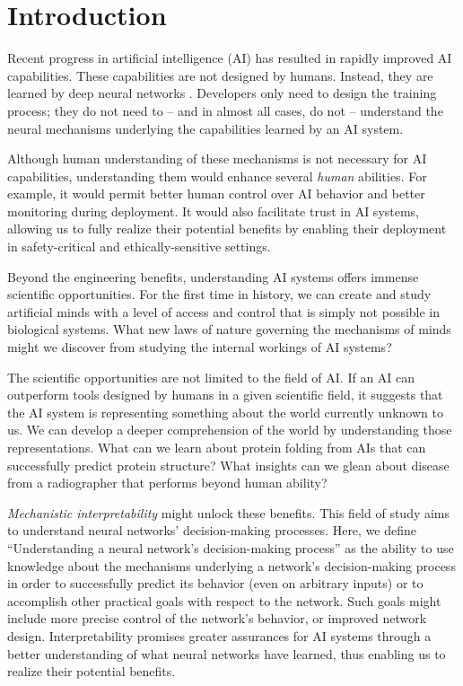 \section{Introduction}
\label{sec:introduction}

Recent progress in artificial intelligence (AI) has resulted in rapidly improved AI capabilities. These capabilities are not designed by humans. Instead, they are learned by deep neural networks \citep{Hinton_2006_EarlyDNN, LeCun_2015_DeepLearning}. Developers only need to design the training process; they do not need to -- and in almost all cases, do not -- understand the neural mechanisms underlying the capabilities learned by an AI system.

Although human understanding of these mechanisms is not necessary for AI capabilities, understanding them would enhance several \textit{human} abilities. For example, it would permit better human control over AI behavior and better monitoring during deployment. It would also facilitate trust in AI systems, allowing us to fully realize their potential benefits by enabling their deployment in safety-critical and ethically-sensitive settings.

Beyond the engineering benefits, understanding AI systems offers immense scientific opportunities. For the first time in history, we can create and study artificial minds with a level of access and control that is simply not possible in biological systems. What new laws of nature governing the mechanisms of minds might we discover from studying the internal workings of AI systems?

The scientific opportunities are not limited to the field of AI. If an AI can outperform tools designed by humans in a given scientific field, it suggests that the AI system is representing something about the world currently unknown to us. We can develop a deeper comprehension of the world by understanding those representations. What can we learn about protein folding from AIs that can successfully predict protein structure? What insights can we glean about disease from a radiographer that performs beyond human ability?

\textit{Mechanistic interpretability} might unlock these benefits. This field of study aims to understand neural networks' decision-making processes. Here, we define “Understanding a neural network's decision-making process” as the ability to use knowledge about the mechanisms underlying a network's decision-making process in order to successfully predict its behavior (even on arbitrary inputs) or to accomplish other practical goals with respect to the network. Such goals might include more precise control of the network's behavior, or improved network design. Interpretability promises greater assurances for AI systems through a better understanding of what neural networks have learned, thus enabling us to realize their potential benefits.

